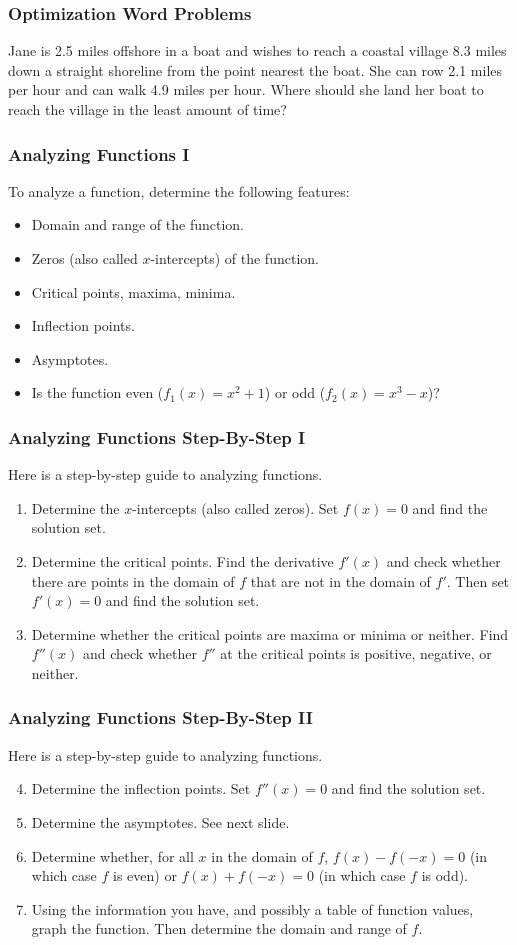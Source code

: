 \documentclass[xcolor=dvipsnames]{beamer}
\newcommand{\hohq}{Jane}
\newcommand{\wili}{She}
\newcommand{\ahhi}{she}
\newcommand{\bohh}{her}
\newcommand{\reeq}{2.5}
\newcommand{\aeza}{8.3}
\newcommand{\emah}{2.1}
\newcommand{\biet}{4.9}
\begin{document}
\begin{frame}
  \frametitle{Optimization Word Problems}
  {\ubung} {\hohq} is {\reeq} miles offshore in a boat and wishes to
  reach a coastal village {\aeza} miles down a straight shoreline from
  the point nearest the boat. {\wili} can row {\emah} miles per hour
  and can walk {\biet} miles per hour. Where should {\ahhi} land
  {\bohh} boat to reach the village in the least amount of time?
\end{frame}

\begin{frame}
  \frametitle{Analyzing Functions I}
To analyze a function, determine the following features:
\begin{itemize}
\item Domain and range of the function.
\item Zeros (also called $x$-intercepts) of the function.
\item Critical points, maxima, minima.
\item Inflection points.
\item Asymptotes.
\item Is the function even ($f_{1}(x)=x^{2}+1$) or odd ($f_{2}(x)=x^{3}-x$)?
\end{itemize}
\end{frame}

\begin{frame}
  \frametitle{Analyzing Functions Step-By-Step I}
Here is a step-by-step guide to analyzing functions.
\begin{enumerate}
\item Determine the $x$-intercepts (also called zeros). Set $f(x)=0$
  and find the solution set.
\item Determine the critical points. Find the derivative $f'(x)$ and
  check whether there are points in the domain of $f$ that are not in
  the domain of $f'$. Then set $f'(x)=0$ and find the solution set.
\item Determine whether the critical points are maxima or minima or
  neither. Find $f''(x)$ and check whether $f''$ at the critical
  points is positive, negative, or neither. 
\end{enumerate}
\end{frame}

\begin{frame}
  \frametitle{Analyzing Functions Step-By-Step II}
Here is a step-by-step guide to analyzing functions.
\begin{enumerate}
\setcounter{enumi}{3}
\item Determine the inflection points. Set $f''(x)=0$ and find the
  solution set.
\item Determine the asymptotes. See next slide.
\item Determine whether, for all $x$ in the domain of $f$,
  $f(x)-f(-x)=0$ (in which case $f$ is even) or $f(x)+f(-x)=0$ (in
  which case $f$ is odd).
\item Using the information you have, and possibly a table of function
  values, graph the function. Then determine the domain and range of
  $f$.
\end{enumerate}
\end{frame}
\end{document}
